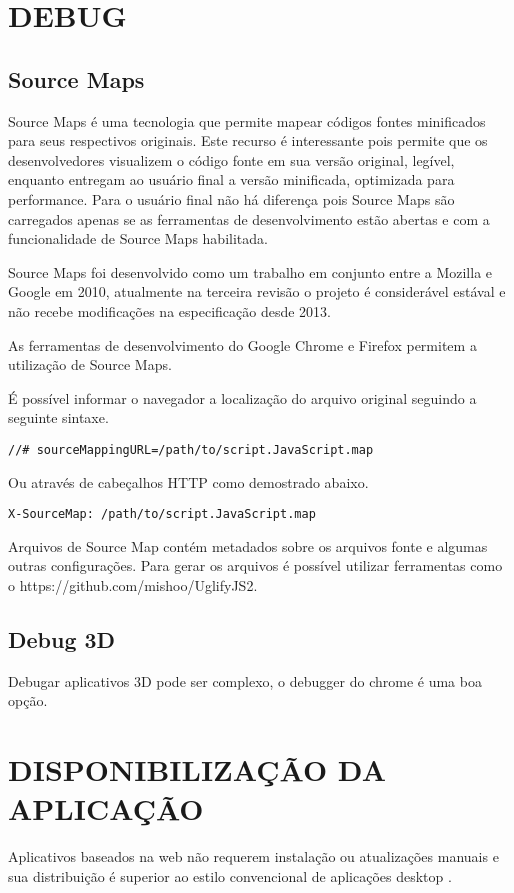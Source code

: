 \section{DEBUG}

\subsection{Source Maps}

Source Maps é uma tecnologia que permite mapear códigos fontes
minificados para seus respectivos originais. Este recurso é
interessante pois permite que os desenvolvedores visualizem o código
fonte em sua versão original, legível, enquanto entregam ao usuário
final a versão minificada, optimizada para performance.
Para o usuário final não há diferença pois Source Maps são
carregados apenas se as ferramentas de desenvolvimento estão abertas e
com a funcionalidade de Source Maps habilitada.

Source Maps foi desenvolvido como um trabalho em conjunto entre a
Mozilla e Google em 2010, atualmente na terceira revisão o projeto é
considerável estával e não recebe modificações na especificação
desde 2013.

As ferramentas de desenvolvimento do Google Chrome e Firefox permitem a
utilização de Source Maps.

É possível informar o navegador a localização do arquivo original
seguindo a seguinte sintaxe.

\begin{verbatim}
//# sourceMappingURL=/path/to/script.JavaScript.map
\end{verbatim}

Ou através de cabeçalhos HTTP como demostrado abaixo.

\begin{verbatim}
X-SourceMap: /path/to/script.JavaScript.map
\end{verbatim}

Arquivos de Source Map contém metadados sobre os arquivos fonte e
algumas outras configurações.
Para gerar os arquivos é possível utilizar ferramentas como o
https://github.com/mishoo/UglifyJS2.

\subsection{Debug 3D}
Debugar aplicativos 3D pode ser complexo, o debugger do chrome é uma boa opção.

\section{DISPONIBILIZAÇÃO DA APLICAÇÃO}
Aplicativos baseados na web não requerem instalação ou atualizações
manuais e sua distribuição é superior ao estilo convencional de
aplicações desktop \autocite{browserGamesTechnologyAndFuture}.


